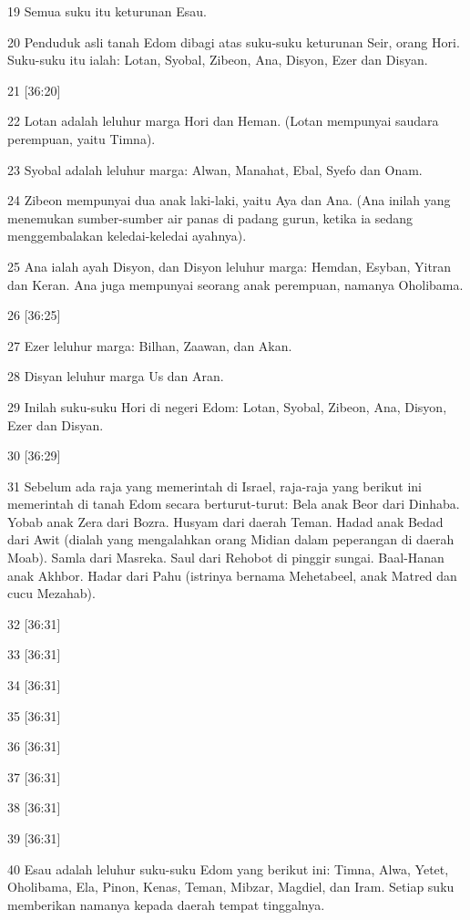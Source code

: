 \par 19 Semua suku itu keturunan Esau.
\par 20 Penduduk asli tanah Edom dibagi atas suku-suku keturunan Seir, orang Hori. Suku-suku itu ialah: Lotan, Syobal, Zibeon, Ana, Disyon, Ezer dan Disyan.
\par 21 [36:20]
\par 22 Lotan adalah leluhur marga Hori dan Heman. (Lotan mempunyai saudara perempuan, yaitu Timna).
\par 23 Syobal adalah leluhur marga: Alwan, Manahat, Ebal, Syefo dan Onam.
\par 24 Zibeon mempunyai dua anak laki-laki, yaitu Aya dan Ana. (Ana inilah yang menemukan sumber-sumber air panas di padang gurun, ketika ia sedang menggembalakan keledai-keledai ayahnya).
\par 25 Ana ialah ayah Disyon, dan Disyon leluhur marga: Hemdan, Esyban, Yitran dan Keran. Ana juga mempunyai seorang anak perempuan, namanya Oholibama.
\par 26 [36:25]
\par 27 Ezer leluhur marga: Bilhan, Zaawan, dan Akan.
\par 28 Disyan leluhur marga Us dan Aran.
\par 29 Inilah suku-suku Hori di negeri Edom: Lotan, Syobal, Zibeon, Ana, Disyon, Ezer dan Disyan.
\par 30 [36:29]
\par 31 Sebelum ada raja yang memerintah di Israel, raja-raja yang berikut ini memerintah di tanah Edom secara berturut-turut: Bela anak Beor dari Dinhaba. Yobab anak Zera dari Bozra. Husyam dari daerah Teman. Hadad anak Bedad dari Awit (dialah yang mengalahkan orang Midian dalam peperangan di daerah Moab). Samla dari Masreka. Saul dari Rehobot di pinggir sungai. Baal-Hanan anak Akhbor. Hadar dari Pahu (istrinya bernama Mehetabeel, anak Matred dan cucu Mezahab).
\par 32 [36:31]
\par 33 [36:31]
\par 34 [36:31]
\par 35 [36:31]
\par 36 [36:31]
\par 37 [36:31]
\par 38 [36:31]
\par 39 [36:31]
\par 40 Esau adalah leluhur suku-suku Edom yang berikut ini: Timna, Alwa, Yetet, Oholibama, Ela, Pinon, Kenas, Teman, Mibzar, Magdiel, dan Iram. Setiap suku memberikan namanya kepada daerah tempat tinggalnya.

